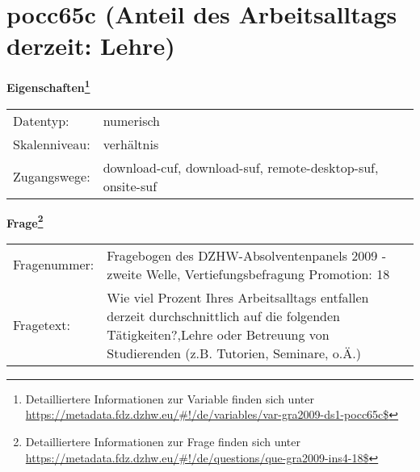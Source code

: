 
    \setcounter{footnote}{0}

    \vspace*{-1.8cm}
	\section{pocc65c (Anteil des Arbeitsalltags derzeit: Lehre)}
	\label{section:pocc65c}



    \vspace*{0.5cm}
    \noindent\textbf{Eigenschaften\footnote{Detailliertere Informationen zur Variable finden sich unter
		\url{https://metadata.fdz.dzhw.eu/\#!/de/variables/var-gra2009-ds1-pocc65c$}}}\\
	\begin{tabularx}{\hsize}{@{}lX}
	Datentyp: & numerisch \\
	Skalenniveau: & verhältnis \\
	Zugangswege: &
	  download-cuf, 
	  download-suf, 
	  remote-desktop-suf, 
	  onsite-suf
 \\
    \end{tabularx}



				\vspace*{0.5cm}
                \noindent\textbf{Frage\footnote{Detailliertere Informationen zur Frage finden sich unter
		              \url{https://metadata.fdz.dzhw.eu/\#!/de/questions/que-gra2009-ins4-18$}}}\\
				\begin{tabularx}{\hsize}{@{}lX}
					Fragenummer: &
					  Fragebogen des DZHW-Absolventenpanels 2009 - zweite Welle, Vertiefungsbefragung Promotion:
					  18
 \\
					Fragetext: & Wie viel Prozent Ihres Arbeitsalltags entfallen derzeit durchschnittlich auf die folgenden Tätigkeiten?,Lehre oder Betreuung von Studierenden (z.B. Tutorien, Seminare, o.Ä.) \\
				\end{tabularx}






